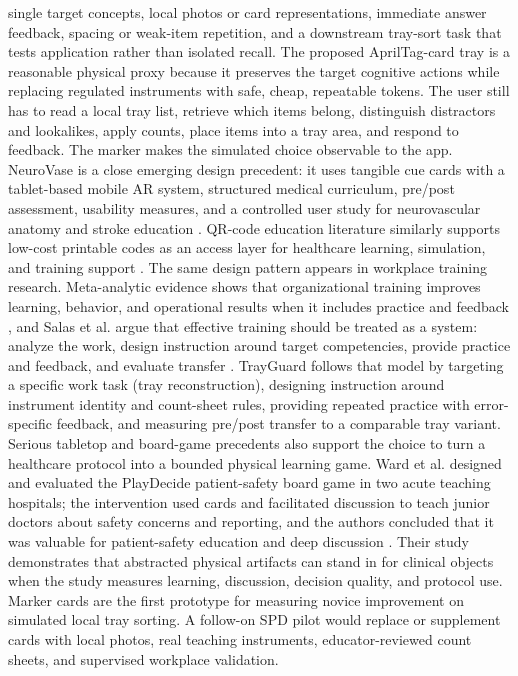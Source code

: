 \documentclass[10pt,a4paper]{article}
\begin{document}
single target concepts, local photos or card representations, immediate answer
feedback, spacing or weak-item repetition, and a downstream tray-sort task that
tests application rather than isolated recall.
The proposed AprilTag-card tray is a reasonable physical proxy because it
preserves the target cognitive actions while replacing regulated instruments
with safe, cheap, repeatable tokens. The user still has to read a local tray
list, retrieve which items belong, distinguish distractors and lookalikes, apply
counts, place items into a tray area, and respond to feedback. The marker
makes the simulated choice observable to the app. NeuroVase is a close emerging
design precedent: it uses tangible cue cards with a tablet-based mobile AR
system, structured medical curriculum, pre/post assessment, usability measures,
and a controlled user study for neurovascular anatomy and stroke education
\cite{jahani-et-al-2026-neurovase}.
QR-code education literature similarly supports low-cost printable codes as an
access layer for healthcare learning, simulation, and training support
\cite{karia-et-al-2019}.
The same design pattern appears in workplace training research.
Meta-analytic evidence shows that organizational training improves learning,
behavior, and operational results when it includes practice and feedback
\cite{arthur-et-al-2003}, and Salas et al. argue that effective training should
be treated as a system: analyze the work, design instruction around target
competencies, provide practice and feedback, and evaluate transfer
\cite{salas-et-al-2012}. TrayGuard follows that model by targeting a specific
work task (tray reconstruction), designing instruction around instrument
identity and count-sheet rules, providing repeated practice with error-specific
feedback, and measuring pre/post transfer to a comparable tray variant.
Serious tabletop and board-game precedents also support the choice to turn a
healthcare protocol into a bounded physical learning game. Ward et al. designed
and evaluated the PlayDecide patient-safety board game in two acute teaching
hospitals; the intervention used cards and facilitated discussion to teach
junior doctors about safety concerns and reporting, and the authors concluded
that it was valuable for patient-safety education and deep discussion
\cite{ward-et-al-2019}. Their study demonstrates
that abstracted physical artifacts can stand in for clinical objects when the
study measures learning, discussion, decision quality, and protocol use.
Marker cards are the first prototype for measuring novice improvement on
simulated local tray sorting. A follow-on SPD pilot would replace or supplement
cards with local photos, real teaching instruments, educator-reviewed count
sheets, and supervised workplace validation.
\end{document}
